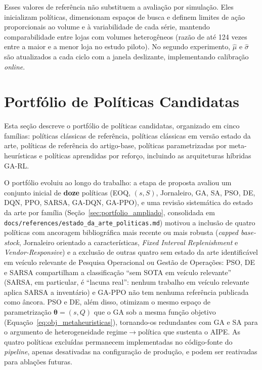 Esses valores de referência não substituem a avaliação por simulação. Eles inicializam políticas, dimensionam espaços de busca e definem limites de ação proporcionais ao volume e à variabilidade de cada série, mantendo comparabilidade entre lojas com volumes heterogêneos (razão de até 124 vezes entre a maior e a menor loja no estudo piloto). No segundo experimento, $\hat{\mu}$ e $\hat{\sigma}$ são atualizados a cada ciclo com a janela deslizante, implementando calibração \textit{online}.

\section{Portfólio de Políticas Candidatas}
\label{sec:benchmark_massivo}

Esta seção descreve o portfólio de políticas candidatas, organizado em cinco famílias: políticas clássicas de referência, políticas clássicas em versão estado da arte, políticas de referência do artigo-base, políticas parametrizadas por meta-heurísticas e políticas aprendidas por reforço, incluindo as arquiteturas híbridas GA-RL.

O portfólio evoluiu ao longo do trabalho: a etapa de proposta avaliou um conjunto inicial de \textbf{doze} políticas (EOQ, $(s,S)$, Jornaleiro, GA, SA, PSO, DE, DQN, PPO, SARSA, GA-DQN, GA-PPO), e uma revisão sistemática do estado da arte por família (Seção~\ref{sec:portfolio_ampliado}, consolidada em \texttt{docs/references/estado\_da\_arte\_politicas.md}) motivou a inclusão de quatro políticas com ancoragem bibliográfica mais recente ou mais robusta (\textit{capped base-stock}, Jornaleiro orientado a características, \textit{Fixed Interval Replenishment} e \textit{Vendor-Responsive}) e a exclusão de outras quatro sem estado da arte identificável em veículo relevante de Pesquisa Operacional ou Gestão de Operações: PSO, DE e SARSA compartilham a classificação ``sem SOTA em veículo relevante'' (SARSA, em particular, é ``lacuna real'': nenhum trabalho em veículo relevante aplica SARSA a inventário) e GA-PPO não tem nenhuma referência publicada como âncora. PSO e DE, além disso, otimizam o mesmo espaço de parametrização $\boldsymbol{\theta}=(s,Q)$ que o GA sob a mesma função objetivo (Equação~\ref{eq:obj_metaheuristicas}), tornando-os redundantes com GA e SA para o argumento de heterogeneidade regime$\rightarrow$política que sustenta o AIPE. As quatro políticas excluídas permanecem implementadas no código-fonte do \textit{pipeline}, apenas desativadas na configuração de produção, e podem ser reativadas para ablações futuras.

